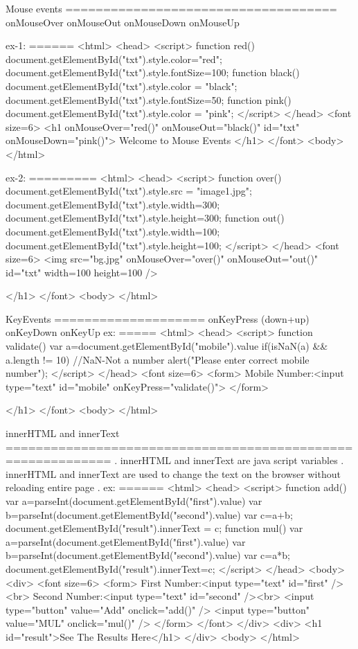 Mouse events
====================================
onMouseOver
onMouseOut
onMouseDown
onMouseUp

ex-1:
======
<html>
    <head>
	   <script>
	      function red()
		  {
			  document.getElementById("txt").style.color="red";
			  document.getElementById("txt").style.fontSize=100;
		  }
		  function black()
		  {
			  document.getElementById("txt").style.color = "black";
			  document.getElementById("txt").style.fontSize=50;
		  }
		  function pink()
		  {
			  document.getElementById("txt").style.color = "pink";
		  }
	   </script>
	</head>
    <font size=6>
   <h1 onMouseOver="red()" onMouseOut="black()" id="txt"  onMouseDown="pink()">
	 Welcome to Mouse Events
	 </h1>
   </font>
  <body>
</html>

ex-2:
=========
<html>
    <head>
	   <script>
	      function over()
		  {
			  document.getElementById("txt").style.src = "image1.jpg";
			  document.getElementById("txt").style.width=300;
			  document.getElementById("txt").style.height=300;
		  }
		  function out()
		  {
			  document.getElementById("txt").style.width=100;
			  document.getElementById("txt").style.height=100;
		  }
	   </script>
	</head>
    <font size=6>
   <img src="bg.jpg" onMouseOver="over()" onMouseOut="out()" id="txt"  width=100 height=100 />
	
	 </h1>
   </font>
  <body>
</html>

KeyEvents
====================
onKeyPress (down+up)
onKeyDown
onKeyUp
ex:
=====
<html>
    <head>
	   <script>
	     function validate()
		 {
			 var a=document.getElementById("mobile").value
			 if(isNaN(a) && a.length != 10) //NaN-Not a number
			 {
				 alert("Please enter correct mobile number");
			 }
		 }
	   </script>
	</head>
    <font size=6>
    <form>
     Mobile Number:<input type="text" id="mobile" onKeyPress="validate()">
	</form>
	
	 </h1>
   </font>
  <body>
</html>

innerHTML and innerText
============================================================
. innerHTML and innerText are java script variables
. innerHTML and innerText are used to change the text on the browser without reloading entire page
. ex:
======
<html>
    <head>
	   <script>
	     function add()
		 {
			 var a=parseInt(document.getElementById("first").value)
			 var b=parseInt(document.getElementById("second").value)
			 var c=a+b;
			 document.getElementById("result").innerText = c;
		 }
		 function mul()
		 {
			 var a=parseInt(document.getElementById("first").value)
			 var b=parseInt(document.getElementById("second").value)
			 var c=a*b;
			 document.getElementById("result").innerText=c;
		}
	   </script>
	</head>
	<body>
	<div>
    <font size=6>
    <form>
      First Number:<input type="text" id="first" /><br>
	  Second Number:<input type="text" id="second" /><br>
	  <input type="button" value="Add" onclick="add()" />
	  <input type="button" value="MUL" onclick="mul()" />
	</form>
   </font>
   </div>
   <div>
     <h1 id="result">See The Results Here</h1>
   </div>
  <body>
</html>

